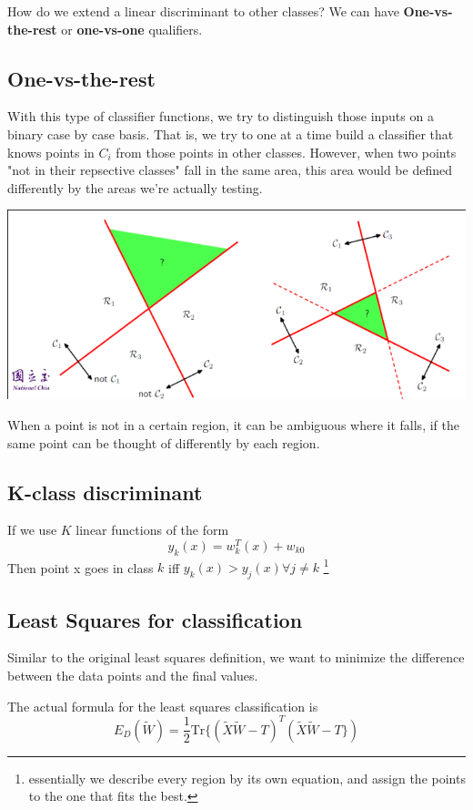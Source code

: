 \documentclass{tufte-handout}
\begin{document}
How do we extend a linear discriminant to other classes? We can have
\textbf{One-vs-the-rest} or \textbf{one-vs-one} qualifiers.
\subsection{One-vs-the-rest}
	With this type of classifier functions, we try to distinguish those
	inputs on a binary case by case basis. That is, we try to one at a time
	build a classifier that knows points in $C_{i}$ from those points in other
	classes. However, when two points  "not in their repsective classes" fall
	in the same area, this area would be defined differently by the areas we're 
	actually testing.
	\begin{marginfigure}
		\includegraphics[width=\linewidth]{ambiguous}
		\caption{When a point is not in a certain region, it can 
			be ambiguous where it falls, if the same point can be thought
			of differently by each region.}
	\end{marginfigure}
\subsection{K-class discriminant}
	If we use $K$ linear functions of the form 
	\[ y_{k}(x) = w^{T}_{k}(x) + w_{k0}\]
	Then point x goes in class $k$ iff $y_{k}(x) > y_{j}(x) \forall j\neq k$ 
	\footnote{essentially we describe every region by its own equation, and assign
		the points to the one that fits the best.}
\subsection{Least Squares for classification}
	Similar to the original least squares definition, we want to minimize the difference
	between the data points and the final values. 

	The actual formula for the least squares classification is
	\[ E_{D}(\widetilde{W}) = \frac{1}{2}\textrm{Tr}\{ (\widetilde{X}\widetilde{W}-T)^{T}(\widetilde{X}
	\widetilde{W}-T\}) \]
\end{document}
